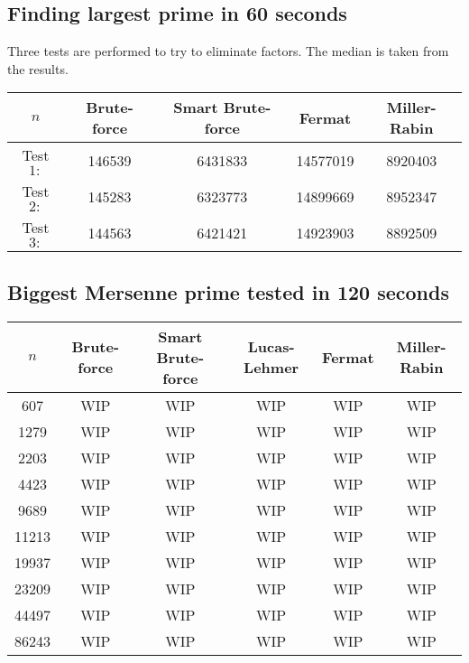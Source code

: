 \documentclass[main.tex]{subfiles}
\begin{document}
\subsection{Finding largest prime in 60 seconds}

Three tests are performed to try to eliminate factors. The median is taken from
the results.

\begin{table}[ht!]
  \centering
  \begin{tabular}{||c c c c c||}
    \hline
    $n$ & Brute-force & Smart Brute-force & Fermat & Miller-Rabin \\ [0.5ex] 
    \hline\hline
    Test $1:$ & 146539 & 6431833 & 14577019 & 8920403\\ 
    Test $2:$ & 145283 & 6323773 & 14899669 & 8952347\\ 
    Test $3:$ & 144563 & 6421421 & 14923903 & 8892509\\   [1ex] 
    \hline
  \end{tabular}
\end{table}

\subsection{Biggest Mersenne prime tested in 120 seconds}

\begin{table}[ht!]
  \centering
  \begin{tabular}{||c c c c c c||}
    \hline
    $n$ & Brute-force & Smart Brute-force & Lucas-Lehmer & Fermat & Miller-Rabin  \\ [0.5ex] 
    \hline\hline
    607 & WIP & WIP & WIP & WIP & WIP\\
    1279 & WIP & WIP & WIP & WIP & WIP\\
    2203 & WIP & WIP & WIP & WIP & WIP\\
    4423 & WIP & WIP & WIP & WIP & WIP\\
    9689 & WIP & WIP & WIP & WIP & WIP\\
    11213 & WIP & WIP & WIP & WIP & WIP\\
    19937 & WIP & WIP & WIP & WIP & WIP\\
    23209 & WIP & WIP & WIP & WIP & WIP\\ 
    44497 & WIP & WIP & WIP & WIP & WIP\\ 
    86243 & WIP & WIP & WIP & WIP & WIP\\  [1ex] 
    \hline
  \end{tabular}
\end{table}
\end{document}
